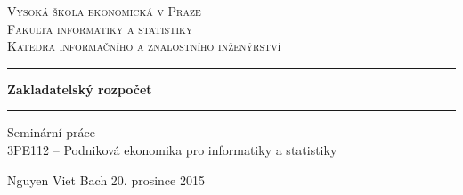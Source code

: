 \begin{titlepage}
\begin{center}

\textsc{\LARGE Vysoká škola ekonomická v Praze}\\[0.5cm]
\textsc{\large Fakulta informatiky a statistiky}\\[0.5cm]
\textsc{\large Katedra informačního a znalostního inženýrství}\\[0.5cm]

\vfill

\hrule
\vspace{0.5cm}
\huge {\bfseries Zakladatelský rozpočet}
\vspace{0.4cm}
\hrule
\vspace{0.4cm}
\large Seminární práce \\ 3PE112 -- Podniková ekonomika pro informatiky a statistiky\\[0.3cm]

\vfill

\large Nguyen Viet Bach \hfill 20. prosince 2015

\end{center}
\end{titlepage}

